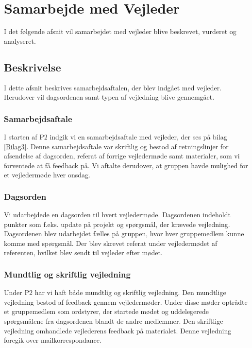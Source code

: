 \chapter{Samarbejde med Vejleder}
I det følgende afsnit vil samarbejdet med vejleder blive beskrevet, vurderet og analyseret. 

\section{Beskrivelse}
I dette afsnit beskrives samarbejdsaftalen, der blev indgået med vejleder. Herudover vil dagsordenen samt typen af vejledning blive gennemgået.

\subsection{Samarbejdsaftale}
I starten af P$2$ indgik vi en samarbejdsaftale med vejleder, der ses på bilag \ref{Bilag3}. Denne samarbejdsaftale var skriftlig og bestod af retningslinjer for afsendelse af dagsorden, referat af forrige vejledermøde samt materialer, som vi forventede at få feedback på. Vi aftalte derudover, at gruppen havde mulighed for et vejledermøde hver onsdag.

\subsection{Dagsorden}
Vi udarbejdede en dagsorden til hvert vejledermøde. Dagsordenen indeholdt punkter som f.eks. update på projekt og spørgsmål, der krævede vejledning. Dagsordenen blev udarbejdet fælles på gruppen, hvor hver gruppemedlem kunne komme med spørgsmål. Der blev skrevet referat under vejledermødet af referenten, hvilket blev sendt til vejleder efter mødet.

\subsection{Mundtlig og skriftlig vejledning}
Under P$2$ har vi haft både mundtlig og skriftlig vejledning. Den mundtlige vejledning bestod af feedback gennem vejledermøder. Under disse møder optrådte et gruppemedlem som ordstyrer, der startede mødet og uddelegerede spørgsmålene fra dagsordenen blandt de andre medlemmer. Den skriftlige vejledning omhandlede vejlederens feedback på materialet. Denne vejledning foregik over mailkorrespondance.


